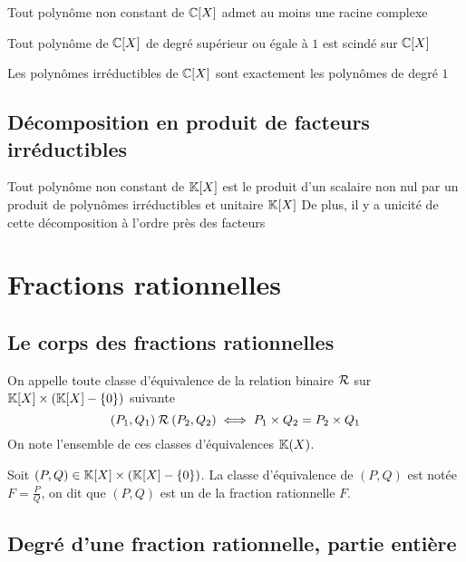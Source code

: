 \begin{thm}
Tout polynôme non constant de $\mathbb{C}[X]$ admet au moins une racine complexe
\end{thm}

\begin{prp}
Tout polynôme de $\mathbb{C}[X]$ de degré supérieur ou égale à $1$ est scindé
sur $\mathbb{C}[X]$
\end{prp}

\begin{prp}
Les polynômes irréductibles de $\mathbb{C}[X]$ sont exactement les polynômes
de degré $1$
\end{prp}

\subsection{Décomposition en produit de facteurs irréductibles}

\begin{thm}
Tout polynôme non constant de $\mathbb{K}[X]$ est le produit d'un scalaire
non nul par un produit de polynômes irréductibles et unitaire $\mathbb{K}[X]$
De plus, il y a unicité de cette décomposition à l'ordre près des
facteurs
\end{thm}

\section{Fractions rationnelles}

\subsection{Le corps des fractions rationnelles}

\begin{dfn}
  On appelle  toute
  classe d'équivalence de la relation binaire $\mathbin{\mathcal{R}}$ sur $\mathbb{K}[X] \times (\mathbb{K}[X] - \{0\})$
  suivante
  \[
    (P_1, Q_1) \mathbin{\mathcal{R}} (P_2, Q_2) \iff P_1 \times Q_2 = P_2 \times Q_1
  \]
  On note l'ensemble de ces classes d'équivalences $\mathbb{K}(X)$.

  Soit $(P, Q) \in \mathbb{K}[X] \times (\mathbb{K}[X] - \{0\})$. La classe d'équivalence
  de $(P, Q)$ est notée $F = \frac{P}{Q}$, on dit que $(P, Q)$ est un
   de la fraction rationnelle $F$.
\end{dfn}


\subsection{Degré d'une fraction rationnelle, partie entière}

